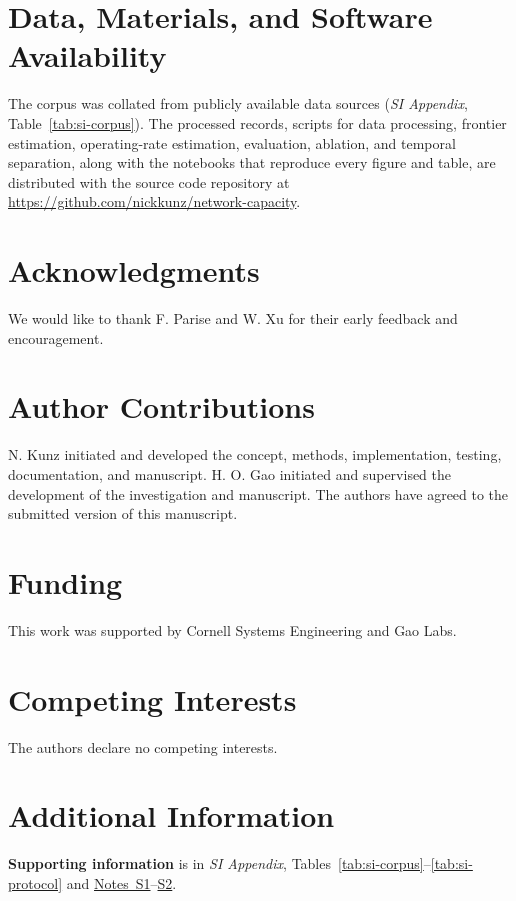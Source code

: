 \documentclass{article}
\begin{document}
\section*{Data, Materials, and Software Availability}
\label{sec:data}
\label{sec:code}
The corpus was collated from publicly available data sources (\textit{SI Appendix}, Table~\ref{tab:si-corpus}). The processed records, scripts for data processing, frontier estimation, operating-rate estimation, evaluation, ablation, and temporal separation, along with the notebooks that reproduce every figure and table, are distributed with the source code repository at \url{https://github.com/nickkunz/network-capacity}.

\section*{Acknowledgments}
\label{sec:acknowledge}
We would like to thank F. Parise and W. Xu for their early feedback and encouragement.

\section*{Author Contributions}
\label{sec:authors}
N. Kunz initiated and developed the concept, methods, implementation, testing, documentation, and manuscript. H. O. Gao initiated and supervised the development of the investigation and manuscript. The authors have agreed to the submitted version of this manuscript.

\section*{Funding}
\label{sec:funding}
This work was supported by Cornell Systems Engineering and Gao Labs.

\section*{Competing Interests}
\label{sec:competing}
The authors declare no competing interests.

\section*{Additional Information}
\label{sec:additional}
\textbf{Supporting information} is in \textit{SI Appendix}, Tables~\ref{tab:si-corpus}--\ref{tab:si-protocol} and \hyperref[sec:si-note-processing]{Notes~S1}--\hyperref[sec:si-note-estimation]{S2}.
\end{document}
